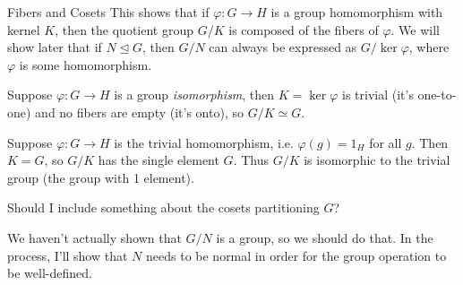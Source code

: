 \documentclass[10pt]{report}
\begin{document}
\begin{note}{Fibers and Cosets}{}
	This shows that if $\varphi:G\to H$ is a group homomorphism with kernel $K$, then the quotient group $G/K$ is composed of the fibers of $\varphi$. We will show later that if $N \trianglelefteq G$, then $G/N$ can always be expressed as $G/\ker \varphi$, where $\varphi$ is some homomorphism.
\end{note}

\begin{ex}{}{}
	Suppose $\varphi:G\to H$ is a group \textit{isomorphism}, then $K=\ker \varphi$ is trivial (it's one-to-one) and no fibers are empty (it's onto), so $G/K \simeq G$.
\end{ex}

\begin{ex}{}{}
	Suppose $\varphi:G\to H$ is the trivial homomorphism, i.e. $\varphi(g) = 1_H$ for all $g$. Then $K=G$, so $G/K$ has the single element $G$. Thus $G/K$ is isomorphic to the trivial group (the group with 1 element).
\end{ex}

{\color{red}Should I include something about the cosets partitioning $G$?}

We haven't actually shown that $G/N$ is a group, so we should do that. In the process, I'll show that $N$ needs to be normal in order for the group operation to be well-defined.
\end{document}
